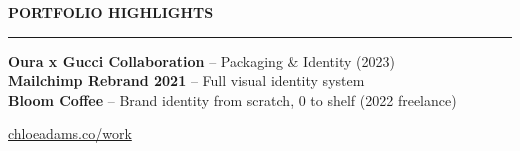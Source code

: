 \documentclass[11pt,a4paper]{article}
\begin{document}
\begin{minipage}[t]{0.61\textwidth}
\vspace{6pt}
\noindent\textcolor{accent}{\textbf{PORTFOLIO HIGHLIGHTS}}\\
\rule{\linewidth}{0.4pt}

\vspace{2pt}
\noindent \textbf{Oura x Gucci Collaboration} -- Packaging \& Identity (2023)\\
\noindent \textbf{Mailchimp Rebrand 2021} -- Full visual identity system\\
\noindent \textbf{Bloom Coffee} -- Brand identity from scratch, 0 to shelf (2022 freelance)

\vspace{2pt}
\noindent\href{https://chloeadams.co/work}{chloeadams.co/work}

\end{minipage}
\end{document}
